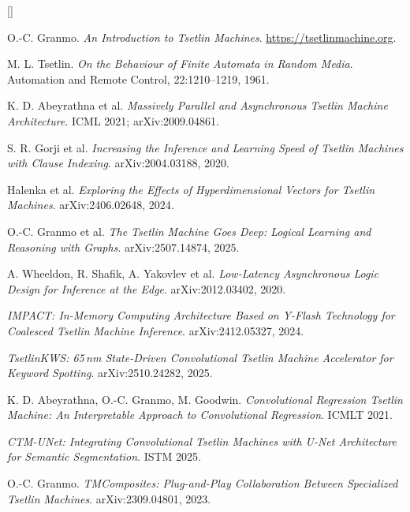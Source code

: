 {\begin{list}{\textcolor{ttorange}{[]}}
\item O.-C. Granmo. \emph{An Introduction to Tsetlin Machines}.
  \url{https://tsetlinmachine.org}.

\item M. L. Tsetlin. \emph{On the Behaviour of Finite Automata in Random Media}. Automation
  and Remote Control, 22:1210--1219, 1961.

\item K. D. Abeyrathna et al. \emph{Massively Parallel and Asynchronous Tsetlin Machine
  Architecture}. ICML 2021; arXiv:2009.04861.

\item S. R. Gorji et al. \emph{Increasing the Inference and Learning Speed of Tsetlin Machines
  with Clause Indexing}. arXiv:2004.03188, 2020.

\item Halenka et al. \emph{Exploring the Effects of Hyperdimensional Vectors for Tsetlin
  Machines}. arXiv:2406.02648, 2024.

\item O.-C. Granmo et al. \emph{The Tsetlin Machine Goes Deep: Logical Learning and Reasoning
  with Graphs}. arXiv:2507.14874, 2025.

\item A. Wheeldon, R. Shafik, A. Yakovlev et al. \emph{Low-Latency Asynchronous Logic Design
  for Inference at the Edge}. arXiv:2012.03402, 2020.

\item \emph{IMPACT: In-Memory Computing Architecture Based on Y-Flash Technology for Coalesced
  Tsetlin Machine Inference}. arXiv:2412.05327, 2024.

\item \emph{TsetlinKWS: 65\,nm State-Driven Convolutional Tsetlin Machine Accelerator for
  Keyword Spotting}. arXiv:2510.24282, 2025.

\item K. D. Abeyrathna, O.-C. Granmo, M. Goodwin. \emph{Convolutional Regression Tsetlin
  Machine: An Interpretable Approach to Convolutional Regression}. ICMLT 2021.

\item \emph{CTM-UNet: Integrating Convolutional Tsetlin Machines with U-Net Architecture for
  Semantic Segmentation}. ISTM 2025.

\item O.-C. Granmo. \emph{TMComposites: Plug-and-Play Collaboration Between Specialized Tsetlin
  Machines}. arXiv:2309.04801, 2023.


\end{list}}
